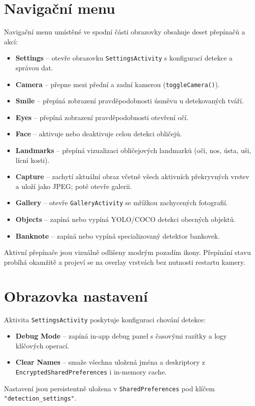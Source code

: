 \documentclass[FM,BP,CZ]{tulthesis}
\begin{document}
\section{Navigační menu}
Navigační menu umístěné ve spodní části obrazovky obsahuje deset přepínačů a akcí:
\begin{itemize}
    \item \textbf{Settings} – otevře obrazovku \texttt{SettingsActivity} s konfigurací detekce a správou dat.
    \item \textbf{Camera} – přepne mezi přední a zadní kamerou (\texttt{toggleCamera()}).
    \item \textbf{Smile} – přepíná zobrazení pravděpodobnosti úsměvu u detekovaných tváří.
    \item \textbf{Eyes} – přepíná zobrazení pravděpodobnosti otevření očí.
    \item \textbf{Face} – aktivuje nebo deaktivuje celou detekci obličejů.
    \item \textbf{Landmarks} – přepíná vizualizaci obličejových landmarků (oči, nos, ústa, uši, lícní kosti).
    \item \textbf{Capture} – zachytí aktuální obraz včetně všech aktivních překryvných vrstev a uloží jako JPEG; poté otevře galerii.
    \item \textbf{Gallery} – otevře \texttt{GalleryActivity} se mřížkou zachycených fotografií.
    \item \textbf{Objects} – zapíná nebo vypíná YOLO/COCO detekci obecných objektů.
    \item \textbf{Banknote} – zapíná nebo vypíná specializovaný detektor bankovek.
\end{itemize}
Aktivní přepínače jsou vizuálně odlišeny modrým pozadím ikony. Přepínání stavu probíhá okamžitě a projeví se na overlay vrstvách bez nutnosti restartu kamery.

\section{Obrazovka nastavení}
Aktivita \texttt{SettingsActivity} poskytuje konfiguraci chování detekce:
\begin{itemize}
    \item \textbf{Debug Mode} – zapíná in-app debug panel s časovými razítky a logy klíčových operací.
    \item \textbf{Clear Names} – smaže všechna uložená jména a deskriptory z \texttt{EncryptedSharedPreferences} i in-memory cache.
\end{itemize}
Nastavení jsou persistentně uložena v \texttt{SharedPreferences} pod klíčem \texttt{"detection\_settings"}.
\end{document}
